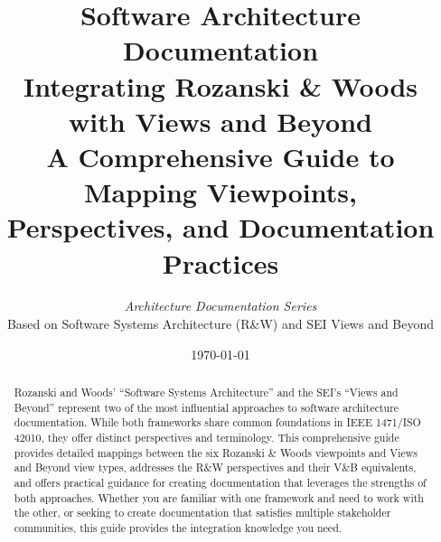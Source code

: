 \documentclass[11pt]{article}
\title{%
    \vspace{-1cm}
    \textbf{\Huge Software Architecture Documentation}\\[12pt]
    \Large Integrating Rozanski \& Woods with Views and Beyond\\[8pt]
    \large A Comprehensive Guide to Mapping Viewpoints,\\
    Perspectives, and Documentation Practices
}
\author{%
    \textit{Architecture Documentation Series}\\[4pt]
    \small Based on Software Systems Architecture (R\&W) and SEI Views and Beyond
}
\date{\today}
\begin{document}
\maketitle
\thispagestyle{empty}

\vspace{0.5cm}

\begin{abstract}
\noindent
Rozanski and Woods' ``Software Systems Architecture'' and the SEI's ``Views and Beyond'' represent two of the most influential approaches to software architecture documentation. While both frameworks share common foundations in IEEE 1471/ISO 42010, they offer distinct perspectives and terminology. This comprehensive guide provides detailed mappings between the six Rozanski \& Woods viewpoints and Views and Beyond view types, addresses the R\&W perspectives and their V\&B equivalents, and offers practical guidance for creating documentation that leverages the strengths of both approaches. Whether you are familiar with one framework and need to work with the other, or seeking to create documentation that satisfies multiple stakeholder communities, this guide provides the integration knowledge you need.
\end{abstract}

\vfill
\end{document}
